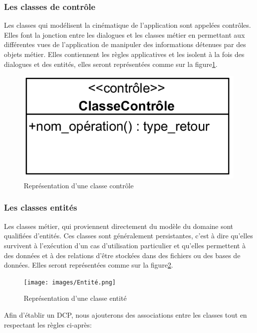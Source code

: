 \subsubsection{Les classes de contrôle}
Les classes qui modélisent la cinématique de l’application sont appelées 
contrôles. Elles font la jonction entre les dialogues et les classes métier en 
permettant aux différentes vues de l’application de manipuler des informations 
détenues par des objets métier. Elles contiennent les règles applicatives et les 
isolent à la fois des dialogues et des entités, elles seront représentées comme 
sur la figure\ref{fig21}.

\begin{figure}[h!]
    \centering
    \includegraphics[scale=1.5]{images/Controle.png}
    \caption{Représentation d'une classe contrôle}
    \label{fig21}
\end{figure}
        
\subsubsection{Les classes entités}
Les classes métier, qui proviennent directement du modèle du domaine sont 
qualifiées d’entités. Ces classes sont généralement persistantes, 
c’est à dire qu’elles survivent à l’exécution d’un cas d’utilisation 
particulier et qu’elles permettent à des données et à des relations d’être 
stockées dans des fichiers ou des bases de données. Elles seront 
représentées comme sur la figure\ref{fig22}.

\clearpage

\begin{figure}[h!]
    \centering
    \texttt{[image: images/Entité.png]}
    \caption{Représentation d'une classe entité}
    \label{fig22}
\end{figure}
        
Afin d’établir un DCP, nous ajouterons des associations entre les classes tout 
en respectant les règles ci-après: \cite{5}

